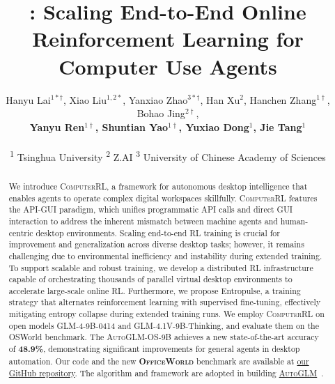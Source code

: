 \documentclass{article} %
\title{\computerrl: Scaling End-to-End Online Reinforcement Learning for Computer Use Agents}
\author{Hanyu Lai$^{1*\dagger}$, Xiao Liu$^{1,2*}$, Yanxiao Zhao$^{3*\dagger}$, Han Xu$^{2}$, Hanchen Zhang$^{1\dagger}$, Bohao Jing$^{2\dagger}$, \\{\bf Yanyu Ren$^{1\dagger}$, Shuntian Yao$^{1\dagger}$, Yuxiao Dong$^{1}$, Jie Tang$^{1}$}\\
\\
\textsuperscript{1} Tsinghua University \quad
\textsuperscript{2} Z.AI \quad
\textsuperscript{3} University of Chinese Academy of Sciences
}
\newcommand{\model}{\textsc{AutoGLM-OS}\xspace}
\newcommand{\computerrl}{\textsc{ComputerRL}\xspace}
\newcommand{\actionmethod}{API-GUI\xspace}
\newcommand{\rlmethod}{Entropulse\xspace}
\newcommand{\glm}{GLM-4-9B-0414\xspace}
\newcommand{\glmv}{GLM-4.1V-9B-Thinking\xspace}
\begin{document}
\maketitle
\begin{abstract}
We introduce \computerrl, a framework for autonomous desktop intelligence that enables agents to operate complex digital workspaces skillfully. \computerrl features the \actionmethod paradigm, which unifies programmatic API calls and direct GUI interaction to address the inherent mismatch between machine agents and human-centric desktop environments.
Scaling end-to-end RL training is crucial for improvement and generalization across diverse desktop tasks; however, it remains challenging due to environmental inefficiency and instability during extended training.
To support scalable and robust training, we develop a distributed RL infrastructure capable of orchestrating thousands of parallel virtual desktop environments to accelerate large-scale online RL. 
Furthermore, we propose \rlmethod, a training strategy that alternates reinforcement learning with supervised fine-tuning, effectively mitigating entropy collapse during extended training runs. 
We employ \computerrl on open models \glm and \glmv, and evaluate them on the OSWorld benchmark. The \model-9B achieves a new state-of-the-art accuracy of \textbf{48.9\%}, demonstrating significant improvements for general agents in desktop automation.
Our code and the new \textsc{\textbf{OfficeWorld}} benchmark are available at \href{https://github.com/thudm/ComputerRL}{our GitHub repository}.
The algorithm and framework are adopted in building \textsc{\href{https://autoglm.zhipuai.cn}{AutoGLM}}~\citep{liu2024autoglmautonomousfoundationagents}.
\end{abstract}
\vspace{-8mm}








\clearpage




\clearpage

\appendix







\end{document}
